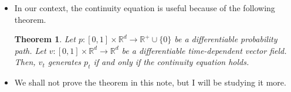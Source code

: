 \documentclass[10pt]{article}
\newtheorem{theorem}[lemma]{Theorem}
\newcommand{\dee}{\mathrm{d}}
\newcommand{\ra}{\rightarrow}
\newcommand{\Real}{\mathbb{R}}
\begin{document}
\begin{itemize}
  \item In our context, the continuity equation is useful because of the following theorem.
  \begin{theorem} \label{thm:continuity-equation}
    Let $p: [0,1] \times \Real^d \rightarrow \Real^+ \cup \{0\}$ be a differentiable probability path. Let $v: [0,1] \times \Real^d \ra \Real^d$ be a differentiable time-dependent vector field. Then, $v_t$ generates $p_t$ if and only if the continuity equation holds.
  \end{theorem}

  \item We shall not prove the theorem in this note, but I will be studying it more.
  
\begin{comment}
  \item Let $h: \Real^d \rightarrow \Real$ be any compactly supported differentiable function. Consider the time derivative of the following expectation
  \begin{align*}
    \frac{\partial}{\partial t} E_{x \sim p_0} [h(\phi_t(x))]
  \end{align*}
  where $\phi: [0,1] \times \Real^d \ra \Real^d$ is the flow generated by $v_t$. We have that
  \begin{align*}
    \frac{\partial}{\partial t} E_{x \sim p_0} [h(\phi_t(x))]
    &= \frac{\partial}{\partial t} \int p_0(x) h(\phi_t(x)) \, \dee x \\
    &= \int p_0(x) \frac{\partial}{\partial t} h(\phi_t(x)) \, \dee x \\
    &= \int p_0(x) \bigg( \sum_{i=1}^d \nabla_i h(\phi_t(x)) \nabla_1 \phi^i_t(x) \bigg) \, \dee x \\
    &= \int p_0(x) \bigg( \sum_{i=1}^d \nabla_i h(\phi_t(x)) v_t^i(\phi_t(x)) \bigg) \, \dee x \\
  \end{align*}
\end{comment}

\end{itemize}



  
\end{document}

